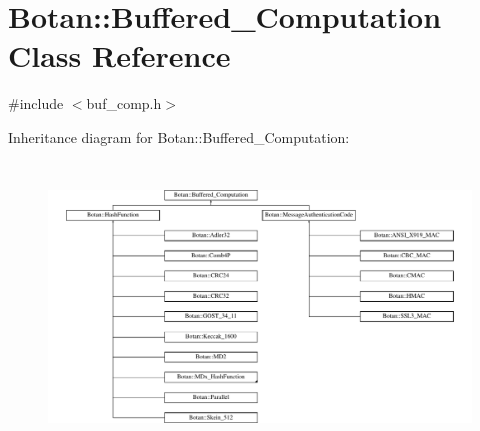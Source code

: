 \hypertarget{classBotan_1_1Buffered__Computation}{\section{Botan\-:\-:Buffered\-\_\-\-Computation Class Reference}
\label{classBotan_1_1Buffered__Computation}
}


{\ttfamily \#include $<$buf\-\_\-comp.\-h$>$}

Inheritance diagram for Botan\-:\-:Buffered\-\_\-\-Computation\-:\begin{figure}[H]
\begin{center}
\leavevmode
\includegraphics[height=7.671233cm]{classBotan_1_1Buffered__Computation}
\end{center}
\end{figure}
